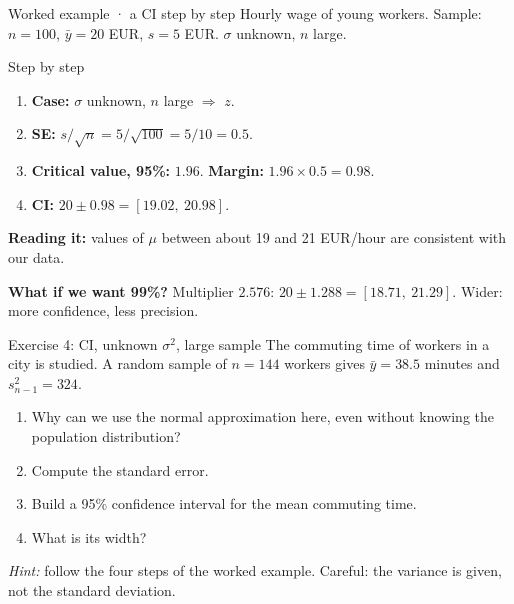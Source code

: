\documentclass[
  11pt,
  ignorenonframetext,
  aspectratio=169,
]{beamer}
\providecommand{\tightlist}{%
  \setlength{\itemsep}{0pt}\setlength{\parskip}{0pt}}
\begin{document}
\begin{frame}{Worked example · a CI step by step}
\protect{}\label{worked-example-a-ci-step-by-step}
Hourly wage of young workers. Sample: \(n=100\), \(\bar y=20\) EUR,
\(s=5\) EUR. \(\sigma\) unknown, \(n\) large.

\begin{block}{Step by step}
\protect{}\label{step-by-step}
\begin{enumerate}
\tightlist
\item
  \textbf{Case:} \(\sigma\) unknown, \(n\) large \(\Rightarrow\) \(z\).
\item
  \textbf{SE:} \(s/\sqrt{n} = 5/\sqrt{100} = 5/10 =0.5\).
\item
  \textbf{Critical value, 95\%:} \(1.96\). \textbf{Margin:}
  \(1.96\times0.5=0.98\).
\item
  \textbf{CI:} \(20\pm0.98=[19.02,\ 20.98]\).
\end{enumerate}
\end{block}

\textbf{Reading it:} values of \(\mu\) between about 19 and 21 EUR/hour
are consistent with our data.

\textbf{What if we want 99\%?} Multiplier \(2.576\):
\(20\pm1.288=[18.71,\ 21.29]\). Wider: more confidence, less precision.
\end{frame}

\begin{frame}{Exercise 4: CI, unknown \(\sigma^2\), large sample}
\protect{}\label{exercise-4-ci-unknown-sigma2-large-sample}
The commuting time of workers in a city is studied. A random sample of
\(n=144\) workers gives \(\bar y=38.5\) minutes and \(s^2_{n-1}=324\).

\begin{enumerate}
\tightlist
\item
  Why can we use the normal approximation here, even without knowing the
  population distribution?
\item
  Compute the standard error.
\item
  Build a 95\% confidence interval for the mean commuting time.
\item
  What is its width?
\end{enumerate}

\emph{Hint:} follow the four steps of the worked example. Careful: the
variance is given, not the standard deviation.
\end{frame}
\end{document}
